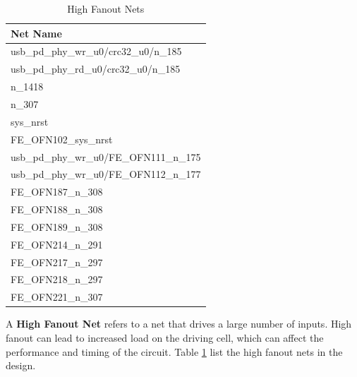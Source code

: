 \begin{table}[h]
    \centering
    \caption{High Fanout Nets}
    \label{tab:high_fanout_net}
    \begin{tabular}{|l|}
        \hline
        \textbf{Net Name} \\ \hline
        usb\_pd\_phy\_wr\_u0/crc32\_u0/n\_185 \\ \hline
        usb\_pd\_phy\_rd\_u0/crc32\_u0/n\_185 \\ \hline
        n\_1418 \\ \hline
        n\_307 \\ \hline
        sys\_nrst \\ \hline
        FE\_OFN102\_sys\_nrst \\ \hline
        usb\_pd\_phy\_wr\_u0/FE\_OFN111\_n\_175 \\ \hline
        usb\_pd\_phy\_wr\_u0/FE\_OFN112\_n\_177 \\ \hline
        FE\_OFN187\_n\_308 \\ \hline
        FE\_OFN188\_n\_308 \\ \hline
        FE\_OFN189\_n\_308 \\ \hline
        FE\_OFN214\_n\_291 \\ \hline
        FE\_OFN217\_n\_297 \\ \hline
        FE\_OFN218\_n\_297 \\ \hline
        FE\_OFN221\_n\_307 \\ \hline
    \end{tabular}
\end{table}

A \textbf{High Fanout Net} refers to a net that drives a large number of inputs. High fanout can lead to increased load on the driving cell, which can affect the performance and timing of the circuit. Table \ref{tab:high_fanout_net} list the high fanout nets in the design.

